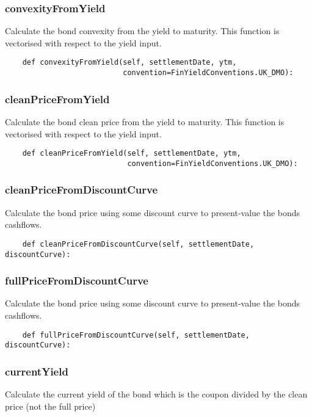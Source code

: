 \documentclass[twoside,11pt]{book}
\begin{document}
\subsubsection*{{\bf convexityFromYield}}
Calculate the bond convexity from the yield to maturity. This function is vectorised with respect to the yield input.  

\begin{lstlisting}
    def convexityFromYield(self, settlementDate, ytm,
                           convention=FinYieldConventions.UK_DMO):
\end{lstlisting}

\subsubsection*{{\bf cleanPriceFromYield}}
Calculate the bond clean price from the yield to maturity. This function is vectorised with respect to the yield input.  

\begin{lstlisting}
    def cleanPriceFromYield(self, settlementDate, ytm,
                            convention=FinYieldConventions.UK_DMO):
\end{lstlisting}

\subsubsection*{{\bf cleanPriceFromDiscountCurve}}
Calculate the bond price using some discount curve to present-value the bonds cashflows.  

\begin{lstlisting}
    def cleanPriceFromDiscountCurve(self, settlementDate, discountCurve):
\end{lstlisting}

\subsubsection*{{\bf fullPriceFromDiscountCurve}}
Calculate the bond price using some discount curve to present-value the bonds cashflows.  

\begin{lstlisting}
    def fullPriceFromDiscountCurve(self, settlementDate, discountCurve):
\end{lstlisting}

\subsubsection*{{\bf currentYield}}
Calculate the current yield of the bond which is the coupon divided by the clean price (not the full price) 
\end{document}
